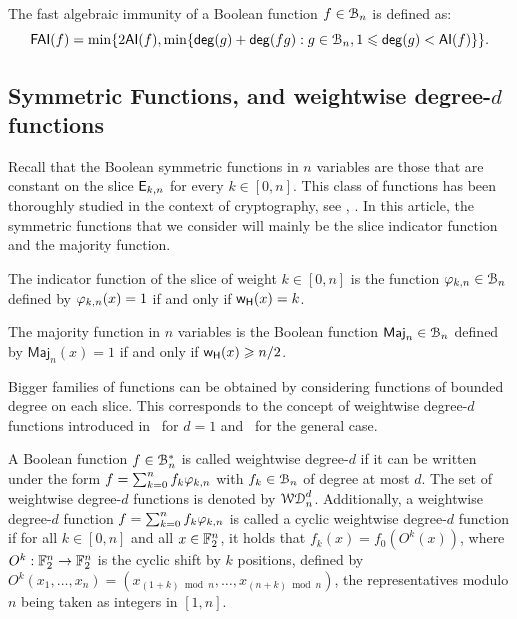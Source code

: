 \documentclass{llncs}
\begin{document}
\begin{definition}\label{def:FAI}
	The fast algebraic immunity of a Boolean function $f\in \mathcal{B}_{n}$ is defined as:
	\[
		\mathsf{FAI}(f)=\min \{ 2 \mathsf{AI}(f), \min\{\mathsf{deg}(g)+ \mathsf{deg}(fg):g\in\mathcal{B}_n,1\leqslant\mathsf{deg}(g)<\mathsf{AI}(f)\}\}.
	\]
\end{definition}

\subsection{Symmetric Functions, \hwbf{} and weightwise degree-$d$ functions}

Recall that the Boolean symmetric functions in $n$ variables are those that are constant on the slice $\mathsf{E}_{k,n}$ for every $k\in [0,n]$. 
This class of functions has been thoroughly studied in the context of cryptography, see \eg, \cite{IEEE:Carlet04,IEEE:CanVid05,INDO:BraPre05,DM:SarMai07,IEEE:QFLW09,IEEE:CheLu11,Latin:Meaux19,CCDS:Meaux21,IEEE:CarMea21}.
In this article, the symmetric functions that we consider will mainly be the slice indicator function and the majority function.

\begin{definition}\label{def:slice}
	The indicator function of the slice of weight $k\in[0,n]$ is the function $\varphi_{k,n}\in\mathcal{B}_n$ defined by $\varphi_{k,n}(x)=1$ if and only if $\mathsf{w_H}(x)=k$.
\end{definition}

\begin{definition}\label{def:maj}
    The majority function in $n$ variables is the Boolean function $\mathsf{Maj}_n\in\mathcal{B}_n$ defined by $\mathsf{Maj}_n(x)=1$ if and only if $\mathsf{w_H}(x)\geqslant n/2$.
\end{definition}

Bigger families of functions can be obtained by considering functions of bounded degree on each slice. This corresponds to the concept of weightwise degree-$d$ functions introduced in~\cite{DAM:GinMea22} for $d=1$ and~\cite{DAM:MeaOza24} for the general case. 

\begin{definition}\label{def:wwdegd}
    A Boolean function $f\in\mathcal{B}_n^*$ is called weightwise degree-$d$ if it can be written under the form $f=\sum_{k=0}^n f_k \varphi_{k,n}$ with $f_k\in\mathcal{B}_n$ of degree at most $d$. The set of weightwise degree-$d$ functions is denoted by $\mathcal{WD}^{d}_{n}$.
	Additionally, a weightwise degree-$d$ function $f=\sum_{k=0}^n f_k \varphi_{k,n}$ is called a cyclic weightwise degree-$d$ function if for all $k\in [0,n]$ and all $x\in\mathbb{F}_2^n$, it holds that $f_k(x)=f_0(O^k(x))$, where $O^k:\mathbb{F}_2^n\to\mathbb{F}_2^n$ is the cyclic shift by $k$ positions, defined by $O^k(x_1,\dots,x_n)=(x_{(1+k)\bmod n},\dots,x_{(n+k)\bmod n})$, the representatives modulo $n$ being taken as integers in $[1,n]$.
\end{definition}
\end{document}
